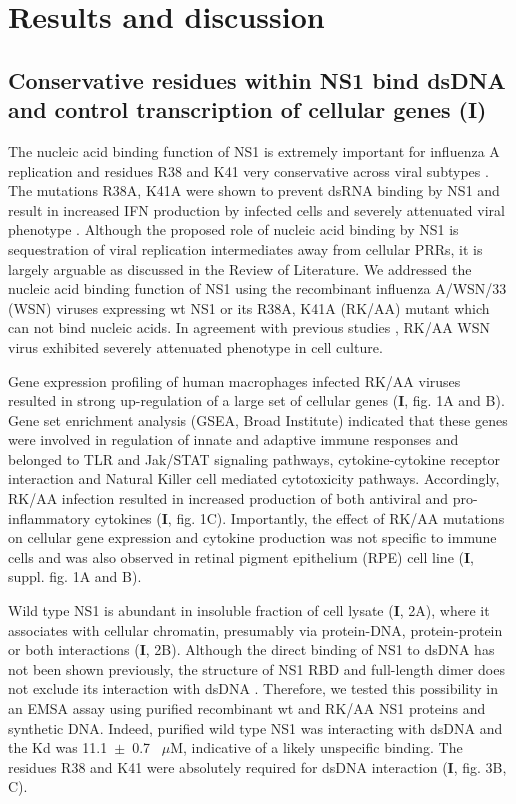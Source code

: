
\clearpage
\section{Results and discussion}

	\subsection{Conservative residues within NS1 bind dsDNA and control transcription of cellular genes (I)}
	
		The nucleic acid binding function of NS1 is extremely important for influenza A replication and residues R38 and K41 very conservative across viral subtypes \parencite{Hatada1992, Zohari2008}. The mutations R38A, K41A were shown to prevent dsRNA binding by NS1 and result in increased IFN production by infected cells and severely attenuated viral phenotype \parencite{Donelan2003}. Although the proposed role of nucleic acid binding by NS1 is sequestration of viral replication intermediates away from cellular \gls{PRR}s, it is largely arguable as discussed in the Review of Literature. We addressed the nucleic acid binding function of NS1 using the recombinant influenza A/WSN/33 (WSN) viruses expressing \gls{wt} NS1 or its R38A, K41A (RK/AA) mutant which can not bind nucleic acids. In agreement with previous studies \parencite{Min2006}, RK/AA WSN virus exhibited severely attenuated phenotype in cell culture. 
		
		Gene expression profiling of human macrophages infected RK/AA viruses resulted in strong up-regulation of a large set of cellular genes (\textbf{I}, fig. 1A and B). Gene set enrichment analysis (GSEA, Broad Institute) indicated that these genes were involved in regulation of innate and adaptive immune responses and belonged to TLR and Jak/STAT signaling pathways, cytokine-cytokine receptor interaction and Natural Killer cell mediated cytotoxicity pathways. Accordingly, RK/AA infection resulted in increased production of both antiviral and pro-inflammatory cytokines (\textbf{I}, fig. 1C). Importantly, the effect of RK/AA mutations on cellular gene expression and cytokine production was not specific to immune cells and was also observed in retinal pigment epithelium (RPE) cell line (\textbf{I}, suppl. fig. 1A and B). 
		
		Wild type NS1 is abundant in insoluble fraction of cell lysate (\textbf{I}, 2A), where it associates with cellular chromatin, presumably via protein-DNA, protein-protein or both interactions (\textbf{I}, 2B). Although the direct binding of NS1 to dsDNA has not been shown previously, the structure of NS1 RBD and full-length dimer does not exclude its interaction with dsDNA \parencite{Bornholdt2008, Cheng2009}. Therefore, we tested this possibility in an \gls{EMSA} assay using purified recombinant \gls{wt} and RK/AA NS1 proteins and synthetic DNA. Indeed, purified wild type NS1 was interacting with dsDNA and the \gls{Kd} was 11.1~$\pm$~0.7~ $\mu$M, indicative of a likely unspecific binding. The residues R38 and K41 were absolutely required for dsDNA interaction (\textbf{I}, fig. 3B, C). 
		
